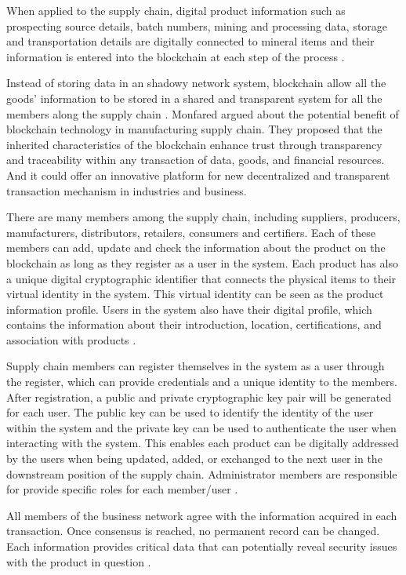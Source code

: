 When applied to the supply chain, digital product information such as prospecting source details, batch numbers, mining and processing data, storage and transportation details are digitally connected to mineral items and their information is entered into the blockchain at each step of the process \cite{caro2018blockchain}.

Instead of storing data in an shadowy network system, blockchain allow all the goods' information to be stored in a shared and transparent system for all the members along the supply chain \cite{tian2017supply}. Monfared \cite{abeyratne2016blockchain} argued about the potential benefit of blockchain technology in manufacturing supply chain. They proposed that the inherited characteristics of the blockchain enhance trust through transparency and traceability within any transaction of data, goods, and financial resources. And it could offer an innovative platform for new decentralized and transparent transaction mechanism in industries and business.

There are many members among the supply chain, including suppliers, producers, manufacturers, distributors, retailers, consumers and certifiers. Each of these members can add, update and check the information about the product on the blockchain as long as they register as a user in the system. Each product has also a unique digital cryptographic identifier that connects the physical items to their virtual identity in the system. This virtual identity can be seen as the product information profile. Users in the system also have their digital profile, which contains the information about their introduction, location, certifications, and association with products \cite{tian2017supply}.

Supply chain members can register themselves in the system as a user through the register, which can provide credentials and a unique identity to the members. After registration, a public and private cryptographic key pair will be generated for each user. The public key can be used to identify the identity of the user within the system and the private key can be used to authenticate the user when interacting with the system. This enables each product can be digitally addressed by the users when being updated, added, or exchanged to the next user in the downstream position of the supply chain. Administrator members are responsible for provide specific roles for each member/user \cite{caro2018blockchain}.

All members of the business network agree with the information acquired in each transaction. Once consensus is reached, no permanent record can be changed. Each information provides critical data that can potentially reveal security issues with the product in question \cite{galvez2018future}.

